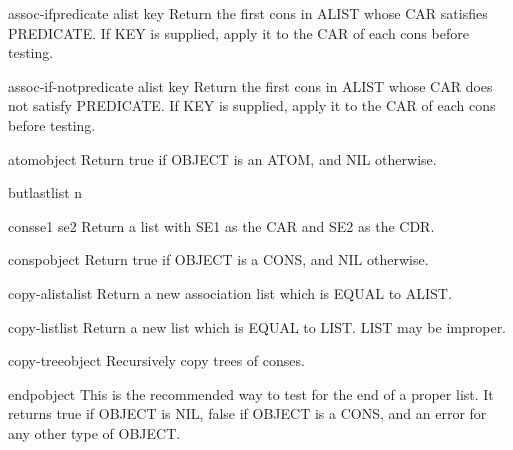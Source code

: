 \begin{function}{assoc-if}{predicate alist \key key}{}{}
  Return the first cons in ALIST whose CAR satisfies PREDICATE. If
   KEY is supplied, apply it to the CAR of each cons before testing.
\end{function}

\begin{function}{assoc-if-not}{predicate alist \key key}{}{}
  Return the first cons in ALIST whose CAR does not satisfy PREDICATE.
  If KEY is supplied, apply it to the CAR of each cons before testing.
\end{function}

\begin{function}{atom}{object}{}{}
  Return true if OBJECT is an ATOM, and NIL otherwise.
\end{function}

\begin{function}{butlast}{list \op n}{}{}
  
\end{function}

\begin{function}{cons}{se1 se2}{}{}
  Return a list with SE1 as the CAR and SE2 as the CDR.
\end{function}

\begin{function}{consp}{object}{}{}
  Return true if OBJECT is a CONS, and NIL otherwise.
\end{function}

\begin{function}{copy-alist}{alist}{}{}
  Return a new association list which is EQUAL to ALIST.
\end{function}

\begin{function}{copy-list}{list}{}{}
  Return a new list which is EQUAL to LIST. LIST may be improper.
\end{function}

\begin{function}{copy-tree}{object}{}{}
  Recursively copy trees of conses.
\end{function}

\begin{function}{endp}{object}{}{}
  This is the recommended way to test for the end of a proper list. It
   returns true if OBJECT is NIL, false if OBJECT is a CONS, and an error
   for any other type of OBJECT.
\end{function}

